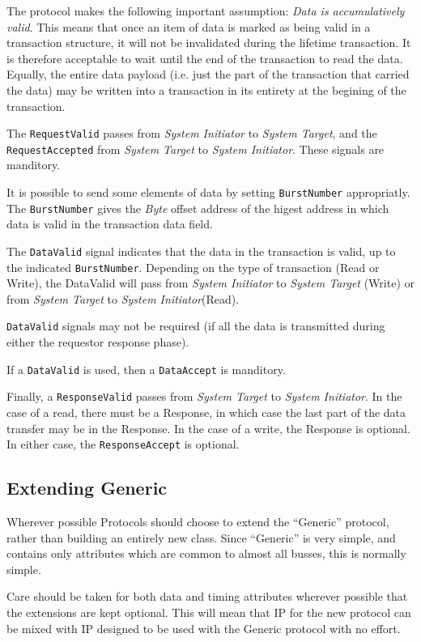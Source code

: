 \documentclass[12pt,oneside]{gsbook}
\newcommand{\master}{{\em System Initiator}\xspace}
\newcommand{\slave}{{\em System Target}\xspace}
\begin{document}
The protocol makes the following important assumption: {\em Data is
accumulatively valid}. This means that once an item of data is marked
as being valid in a transaction structure, it will not be invalidated
during the lifetime transaction.  It is therefore acceptable to wait
until the end of the transaction to read the data. Equally, the entire
data payload (i.e. just the part of the transaction that carried the
data) may be written into a transaction in its entirety at the
begining of the transaction.

The {\tt RequestValid} passes from \master to \slave, and the {\tt RequestAccepted}
from \slave to \master. These signals are manditory.

It is possible to send some elements of data by setting
{\tt BurstNumber} appropriatly. The {\tt BurstNumber} gives the {\em
Byte} offset address of the higest address in which data is valid in
the transaction data field.

The {\tt DataValid} signal indicates that the data in the transaction is
valid, up to the indicated {\tt BurstNumber}. Depending on the type of
transaction (Read or Write), the DataValid will pass from \master to \slave
(Write) or from \slave to  \master (Read).

{\tt DataValid} signals may not be required (if all the data is
transmitted during either the requestor response phase).

If a {\tt DataValid} is used, then a {\tt DataAccept}  is
manditory.

Finally, a {\tt ResponseValid} passes from \slave to \master. In the case of
a read, there must be a Response, in which case the last part of the
data transfer may be in the Response. In the case of a write, the
Response is optional. In either case, the {\tt ResponseAccept} is
optional.


\subsection{Extending Generic}

Wherever possible Protocols should choose to extend the ``Generic''
protocol, rather than building an entirely new class. Since
``Generic'' is very simple, and contains only attributes which are
common to almost all busses, this is normally simple.

Care should be taken for both data and timing attributes wherever
possible that the extensions are kept optional. This will mean that IP
for the new protocol can be mixed with IP designed to be used with the
Generic protocol with no effort.
\end{document}
